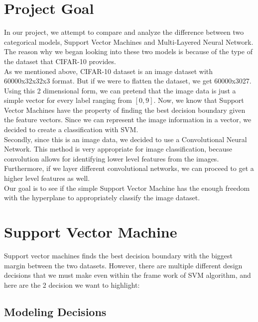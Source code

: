 \documentclass[12pt, a4paper]{article}
\begin{document}
	\section{Project Goal}
		In our project, we attempt to compare and analyze the difference between two categorical models, Support Vector Machines and Multi-Layered Neural Network. The reason why we began looking into these two models is because of the type of the dataset that CIFAR-10 provides.\\
		As we mentioned above, CIFAR-10 dataset is an image dataset with 60000x32x32x3 format. But if we were to flatten the dataset, we get 60000x3027. Using this 2 dimensional form, we can pretend that the image data is just a simple vector for every label ranging from $[0,9]$. Now, we know that Support Vector Machines have the property of finding the best decision boundary given the feature vectors. Since we can represent the image information in a vector, we decided to create a classification with SVM.\\
		Secondly, since this is an image data, we decided to use a Convolutional Neural Network. This method is very appropriate for image classification, because convolution allows for identifying lower level features from the images. Furthermore, if we layer different convolutional networks, we can proceed to get a higher level features as well.\\
		Our goal is to see if the simple Support Vector Machine has the enough freedom with the hyperplane to appropriately classify the image dataset.
	\section{Support Vector Machine}
		Support vector machines finds the best decision boundary with the biggest margin between the two datasets. However, there are multiple different design decisions that we must make even within the frame work of SVM algorithm, and here are the 2 decision we want to highlight:
		\subsection{Modeling Decisions}
\end{document}
